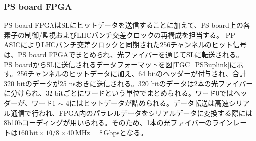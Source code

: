     \subsubsection*{PS board FPGA}

    PS board FPGAはSLにヒットデータを送信することに加えて、PS board上の各素子の制御/監視およびLHCバンチ交差クロックの再構成を担当する。
    PP ASICによりLHCバンチ交差クロックと同期された256チャンネルのヒット信号は、PS board FPGAでまとめられ、光ファイバーを通じてSLに転送される。
    PS boardからSLに送信されるデータフォーマットを図\ref{TGC_PSBuplink}に示す。256チャンネルのヒットデータに加え、64 bitのヘッダーが付与され、合計320 bitのデータが25 nsおきに送信される。320 bitのデータは2本の光ファイバーに分けられ、32 bitごとにワードという単位でまとめられる。ワード0ではヘッダーが、ワード1 $\sim$ 4にはヒットデータが詰められる。データ転送は高速シリアル通信で行われ、FPGA内のパラレルデータをシリアルデータに変換する際には8b10bコーディングが用いられる。そのため、1本の光ファイバーのラインレートは$160 \, \mathrm{bit} \times 10/8 \times 40 \mathrm{\,MHz} = 8 \,\mathrm{Gbps}$となる。

